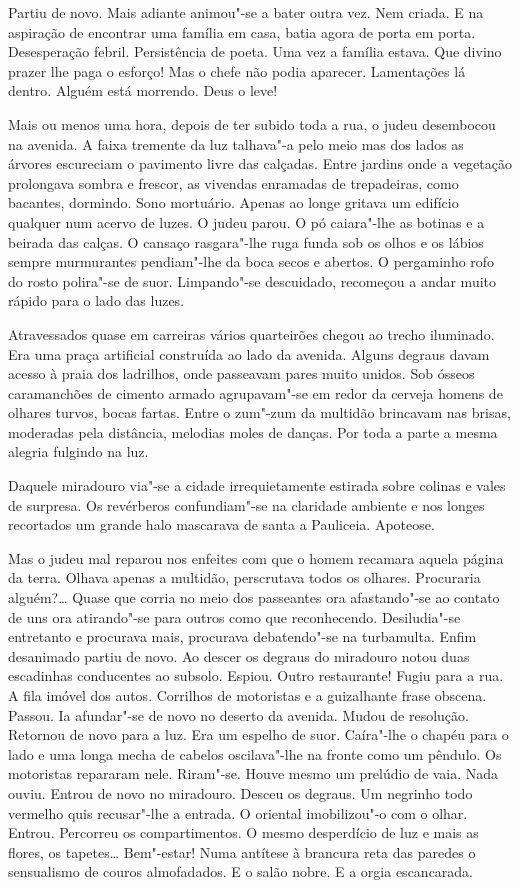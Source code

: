 Partiu de novo. Mais adiante animou"-se a bater outra vez. Nem criada. E
na aspiração de encontrar uma família em casa, batia agora de porta em
porta. Desesperação febril. Persistência de poeta. Uma vez a família
estava. Que divino prazer lhe paga o esforço! Mas o chefe não podia
aparecer. Lamentações lá dentro. Alguém está morrendo. Deus o leve!

Mais ou menos uma hora, depois de ter subido toda a rua, o judeu
desembocou na avenida. A faixa tremente da luz talhava"-a pelo meio mas
dos lados as árvores escureciam o pavimento livre das calçadas. Entre
jardins onde a vegetação prolongava sombra e frescor, as vivendas
enramadas de trepadeiras, como bacantes, dormindo. Sono mortuário.
Apenas ao longe gritava um edifício qualquer num acervo de luzes. O
judeu parou. O pó caiara"-lhe as botinas e a beirada das calças. O
cansaço rasgara"-lhe ruga funda sob os olhos e os lábios sempre
murmurantes pendiam"-lhe da boca secos e abertos. O pergaminho rofo do
rosto polira"-se de suor. Limpando"-se descuidado, recomeçou a andar muito
rápido para o lado das luzes.

Atravessados quase em carreiras vários quarteirões chegou ao trecho
iluminado. Era uma praça artificial construída ao lado da avenida.
Alguns degraus davam acesso à praia dos ladrilhos, onde passeavam pares
muito unidos. Sob ósseos caramanchões de cimento armado agrupavam"-se em
redor da cerveja homens de olhares turvos, bocas fartas. Entre o zum"-zum
da multidão brincavam nas brisas, moderadas pela distância, melodias
moles de danças. Por toda a parte a mesma alegria fulgindo na luz.

Daquele miradouro via"-se a cidade irrequietamente estirada sobre colinas
e vales de surpresa. Os revérberos confundiam"-se na claridade ambiente e
nos longes recortados um grande halo mascarava de santa a Pauliceia.
Apoteose.

Mas o judeu mal reparou nos enfeites com que o homem recamara aquela
página da terra. Olhava apenas a multidão, perscrutava todos os olhares.
Procuraria alguém?\ldots{} Quase que corria no meio dos passeantes ora
afastando"-se ao contato de uns ora atirando"-se para outros como que
reconhecendo. Desiludia"-se entretanto e procurava mais, procurava
debatendo"-se na turbamulta. Enfim desanimado partiu de novo. Ao descer
os degraus do miradouro notou duas escadinhas conducentes ao subsolo.
Espiou. Outro restaurante! Fugiu para a rua. A fila imóvel dos autos.
Corrilhos de motoristas e a guizalhante frase obscena. Passou. Ia
afundar"-se de novo no deserto da avenida. Mudou de resolução. Retornou
de novo para a luz. Era um espelho de suor. Caíra"-lhe o chapéu para o
lado e uma longa mecha de cabelos oscilava"-lhe na fronte como um
pêndulo. Os motoristas repararam nele. Riram"-se. Houve mesmo um prelúdio
de vaia. Nada ouviu. Entrou de novo no miradouro. Desceu os degraus. Um
negrinho todo vermelho quis recusar"-lhe a entrada. O oriental
imobilizou"-o com o olhar. Entrou. Percorreu os compartimentos. O mesmo
desperdício de luz e mais as flores, os tapetes\ldots{} Bem"-estar! Numa
antítese à brancura reta das paredes o sensualismo de couros
almofadados. E o salão nobre. E a orgia escancarada.

